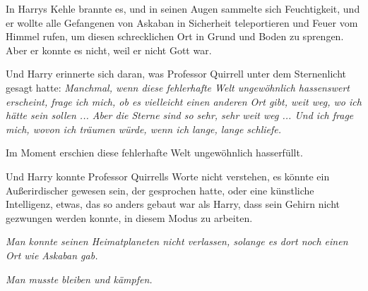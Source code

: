 In Harrys Kehle brannte es, und in seinen Augen sammelte sich Feuchtigkeit, und
er wollte alle Gefangenen von Askaban in Sicherheit teleportieren und Feuer vom
Himmel rufen, um diesen schrecklichen Ort in Grund und Boden zu sprengen. Aber
er konnte es nicht, weil er nicht Gott war.

Und Harry erinnerte sich daran, was Professor Quirrell unter dem Sternenlicht
gesagt hatte: \emph{Manchmal, wenn diese fehlerhafte Welt ungewöhnlich
hassenswert erscheint, frage ich mich, ob es vielleicht einen anderen Ort gibt,
weit weg, wo ich hätte sein sollen ... Aber die Sterne sind so sehr, sehr weit
weg ... Und ich frage mich, wovon ich träumen würde, wenn ich lange, lange
schliefe.}

Im Moment erschien diese fehlerhafte Welt ungewöhnlich hasserfüllt.

Und Harry
konnte Professor Quirrells Worte nicht verstehen, es könnte ein Außerirdischer
gewesen sein, der gesprochen hatte, oder eine künstliche Intelligenz, etwas, das
so anders gebaut war als Harry, dass sein Gehirn nicht gezwungen werden konnte,
in diesem Modus zu arbeiten.

\emph{Man konnte seinen Heimatplaneten nicht verlassen, solange es dort noch
einen Ort wie Askaban gab.}

\emph{Man musste bleiben und kämpfen.}
